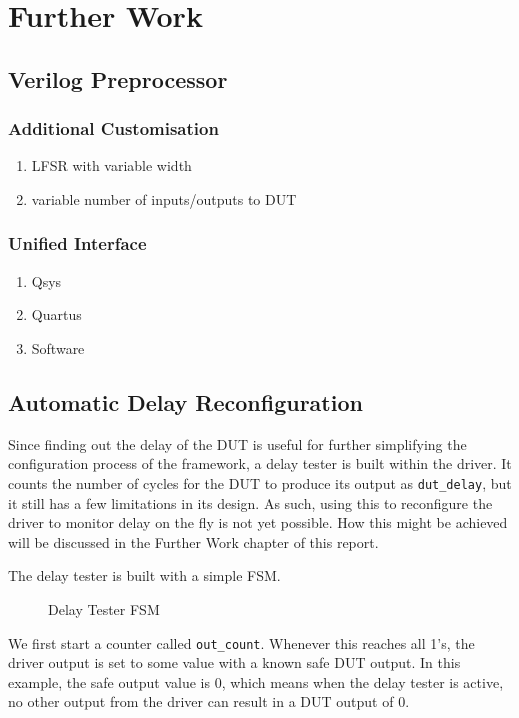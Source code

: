 \chapter{Further Work}

\section{Verilog Preprocessor}

\subsection{Additional Customisation}
\begin{enumerate}
  \item LFSR with variable width
  \item variable number of inputs/outputs to DUT
\end{enumerate}

\subsection{Unified Interface}
\begin{enumerate}
  \item Qsys
  \item Quartus
  \item Software
\end{enumerate}
\section{Automatic Delay Reconfiguration}

Since finding out the delay of the DUT is useful for further simplifying the configuration process of the framework, a delay tester is built within the driver.
It counts the number of cycles for the DUT to produce its output as \texttt{dut\_delay}, but it still has a few limitations in its design.
As such, using this to reconfigure the driver to monitor delay on the fly is not yet possible.
How this might be achieved will be discussed in the Further Work chapter of this report.

The delay tester is built with a simple FSM.

\begin{figure}[H]
  \centering
  
  \caption{Delay Tester FSM}
  \label{DelayTesterFSM}
\end{figure}

We first start a counter called \texttt{out\_count}.
Whenever this reaches all 1's, the driver output is set to some value with a known safe DUT output.
In this example, the safe output value is 0, which means when the delay tester is active, no other output from the driver can result in a DUT output of 0.

